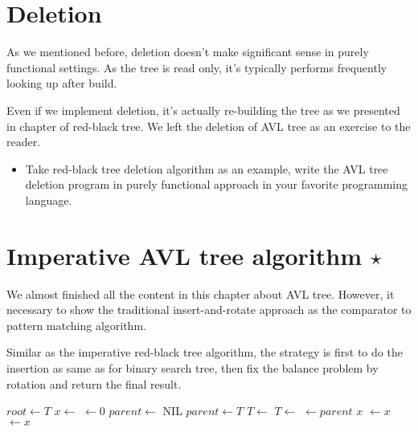 \documentclass{article}
\begin{document}

\section{Deletion}

As we mentioned before, deletion doesn't make significant sense in
purely functional settings. As the tree is read only, it's typically
performs frequently looking up after build.

Even if we implement deletion, it's actually re-building the tree
as we presented in chapter of red-black tree. We left the deletion
of AVL tree as an exercise to the reader.

\begin{Exercise}

\begin{itemize}

\item Take red-black tree deletion algorithm as an example, write the
AVL tree deletion program in purely functional approach in your
favorite programming language.
\end{itemize}

\end{Exercise}

\section{Imperative AVL tree algorithm $\star$}

We almost finished all the content in this chapter about AVL tree.
However, it necessary to show the traditional insert-and-rotate
approach as the comparator to pattern matching algorithm.

Similar as the imperative red-black tree algorithm, the strategy
is first to do the insertion as same as for binary search tree,
then fix the balance problem by rotation and return the final result.

\begin{algorithmic}[1]
  \State $root \gets T$
  \State $x \gets$ 
  \State {} $\gets 0$
  \State $parent \gets$ NIL
    \State $parent \gets T$
      \State $T \gets $ 
    \Else
      \State $T \gets $ 
    \EndIf
  \EndWhile
  \State {} $\gets parent$
   
    \State \Return $x$
    \State {} $\gets x$
  \Else
    \State {} $\gets x$
  \EndIf
  \State \Return {}
\EndFunction
\end{algorithmic}
\end{document}
